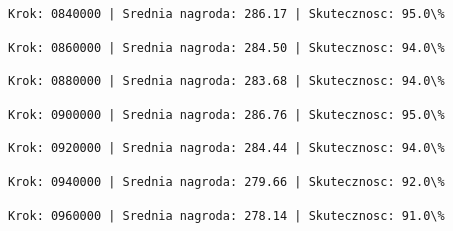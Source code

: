 \documentclass[11pt]{article}
\begin{document}
    
    
    \begin{Verbatim}[commandchars=\\\{\}]
Krok: 0840000 | Srednia nagroda: 286.17 | Skutecznosc: 95.0\%

    \end{Verbatim}

    
    
    \begin{Verbatim}[commandchars=\\\{\}]
Krok: 0860000 | Srednia nagroda: 284.50 | Skutecznosc: 94.0\%

    \end{Verbatim}

    
    
    \begin{Verbatim}[commandchars=\\\{\}]
Krok: 0880000 | Srednia nagroda: 283.68 | Skutecznosc: 94.0\%

    \end{Verbatim}

    
    
    \begin{Verbatim}[commandchars=\\\{\}]
Krok: 0900000 | Srednia nagroda: 286.76 | Skutecznosc: 95.0\%

    \end{Verbatim}

    
    
    \begin{Verbatim}[commandchars=\\\{\}]
Krok: 0920000 | Srednia nagroda: 284.44 | Skutecznosc: 94.0\%

    \end{Verbatim}

    
    
    \begin{Verbatim}[commandchars=\\\{\}]
Krok: 0940000 | Srednia nagroda: 279.66 | Skutecznosc: 92.0\%

    \end{Verbatim}

    
    
    \begin{Verbatim}[commandchars=\\\{\}]
Krok: 0960000 | Srednia nagroda: 278.14 | Skutecznosc: 91.0\%

    \end{Verbatim}
\end{document}
